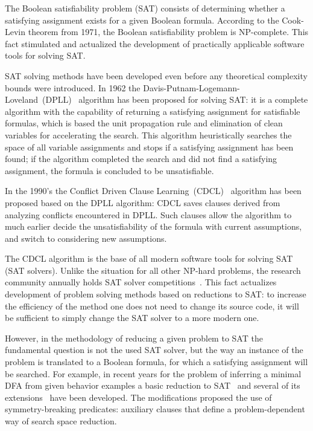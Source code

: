 The Boolean satisfiability problem (SAT) consists of determining whether a satisfying assignment exists for a given Boolean formula.
According to the Cook-Levin theorem from 1971, the Boolean satisfiability problem is NP-complete.
This fact stimulated and actualized the development of practically applicable software tools for solving SAT.

SAT solving methods have been developed even before any theoretical complexity bounds were introduced.
In 1962 the Davis-Putnam-Logemann-Loveland~(DPLL)~\cite{DBLP:journals/cacm/DavisLL62} algorithm has been proposed for solving SAT: it is a complete algorithm with the capability of returning a 
satisfying assignment for satisfiable formulas, which is based the unit propagation rule and elimination of clean variables for accelerating the search.
This algorithm heuristically searches the space of all variable assignments and stops if a satisfying assignment has been found; if the algorithm completed the search and did not find a satisfying assignment, the formula is concluded to be unsatisfiable.

In the 1990's the Conflict Driven Clause Learning~(CDCL)~\cite{DBLP:conf/iccad/SilvaS96} algorithm has been proposed based on the DPLL algorithm: CDCL saves clauses derived from analyzing conflicts 
encountered in DPLL.
Such clauses allow the algorithm to much earlier decide the unsatisfiability of the formula with current assumptions, and switch to considering new assumptions.

The CDCL algorithm is the base of all modern software tools for solving SAT (SAT solvers).
Unlike the situation for all other NP-hard problems, the research community annually holds SAT solver competitions~\cite{sat-competitions,sat-competition-2020}.
This fact actualizes development of problem solving methods based on reductions to SAT:
to increase the efficiency of the method one does not need to change its source code, it will be sufficient to simply change the SAT solver to a more modern one.

However, in the methodology of reducing a given problem to SAT the fundamental question is not the used SAT solver, but the way an instance of the problem is translated to a Boolean formula,
for which a satisfying assignment will be searched.
For example, in recent years for the problem of inferring a minimal DFA from given behavior examples a basic reduction to SAT~\cite{heule-icgi10} and several of 
its extensions~\cite{DBLP:journals/ese/HeuleV13,ulyantsev-phd-13-en} have been developed.
The modifications proposed the use of symmetry-breaking predicates: auxiliary clauses that define a problem-dependent way of search space reduction.

